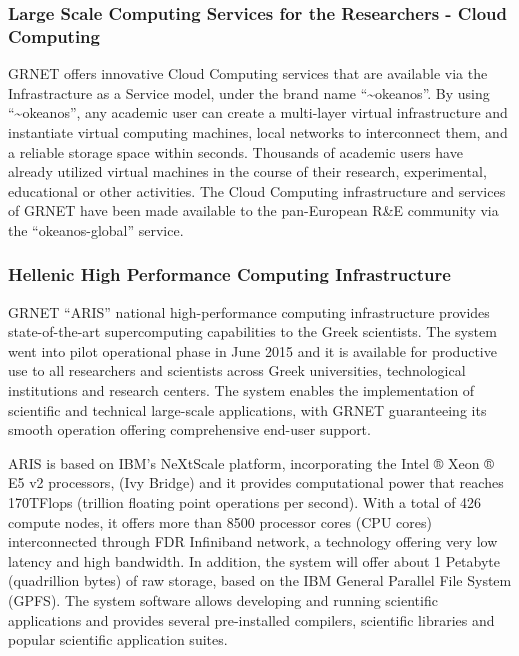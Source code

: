 \subsubsection{Large Scale Computing Services for the Researchers - Cloud Computing}
GRNET offers innovative Cloud Computing services
that are available via the Infrastracture as a Service model,
under the brand name “\textasciitilde okeanos”.
By using “\textasciitilde okeanos”,
any academic user can create a multi-layer virtual infrastructure
and instantiate virtual computing machines,
local networks to interconnect them,
and a reliable storage space within seconds.
Thousands of academic users have already utilized virtual machines
in the course of their research, experimental, educational or other activities.
The Cloud Computing infrastructure and services of GRNET
have been made available to the pan-European R\&E community
via the “okeanos-global” service.

\subsubsection{Hellenic High Performance Computing Infrastructure}
GRNET “ARIS” national high-performance computing infrastructure
provides state-of-the-art supercomputing capabilities
to the Greek scientists.
The system went into pilot operational phase in June 2015
and it is available for productive use
to all researchers and scientists across
Greek universities, technological institutions and research centers.
The system enables the implementation of scientific
and technical large-scale applications,
with GRNET guaranteeing its smooth operation
offering comprehensive end-user support.

ARIS is based on IBM’s NeXtScale platform,
incorporating the Intel ® Xeon ® E5 v2 processors,
(Ivy Bridge) and it provides computational power
that reaches 170TFlops (trillion floating point operations per second).
With a total of 426 compute nodes,
it offers more than 8500 processor cores (CPU cores)
interconnected through FDR Infiniband network,
a technology offering very low latency and high bandwidth.
In addition, the system will offer about
1 Petabyte (quadrillion bytes) of raw storage,
based on the IBM General Parallel File System (GPFS).
The system software allows developing
and running scientific applications
and provides several pre-installed compilers,
scientific libraries and popular scientific application suites.

